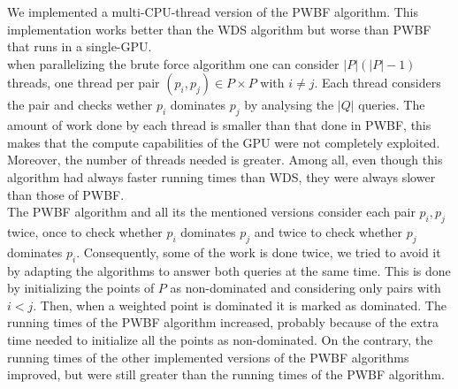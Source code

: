 \documentclass[11pt,onecolumn]{elsart3p}
\begin{document}
 We implemented a multi-CPU-thread version of the PWBF algorithm. This implementation works better than the WDS algorithm but worse than PWBF that runs in a single-GPU.\\ %

 when parallelizing the brute force algorithm one can consider $|P|(|P|-1)$ threads, one thread per pair $(p_i,p_j) \in P\times P$ with $i\neq j$. Each thread considers the pair and checks wether $p_i$ dominates $p_j$ by analysing the $|Q|$ queries. The amount of work done by each thread is smaller than that done in PWBF, this makes that the compute capabilities of the GPU were not completely exploited. Moreover, the number of threads needed is greater. Among all, even though this algorithm had always faster running times than WDS, they were always slower than those of PWBF.\\%


 The PWBF algorithm and all its the mentioned versions consider each pair $p_i,p_j$ twice, once to check whether $p_i$ dominates $p_j$ and twice to check whether $p_j$ dominates $p_i$. Consequently, some of the work is done twice, we tried to avoid it by adapting the algorithms to answer both queries at the same time. This is done by initializing the points of $P$ as non-dominated and considering only pairs with $i<j$. Then, when a weighted point is dominated it is marked as dominated. The running times of the PWBF algorithm increased, probably because of the extra time needed to initialize all the points as non-dominated. On the contrary, the running times of the other implemented versions of the PWBF algorithms improved, but were still greater than the running times of the PWBF algorithm.\\ %

\end{document}
